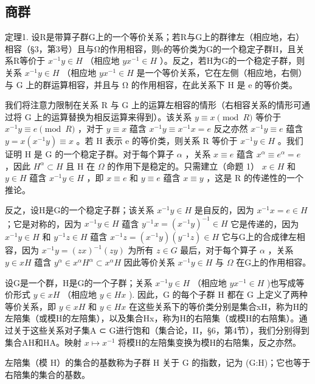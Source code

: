 \subsection{商群}

定理1. 设R是带算子群G上的一个等价关系；若R与G上的群律左（相应地，右）相容（§3，第3号）且与Ω的作用相容，则e的等价类为G的一个稳定子群H，且关系R等价于 \(x^{-1}y \in H\) （相应地 \(yx^{-1} \in H\) ）。反之，若H为G的一个稳定子群，则关系 \(x^{-1}y \in H\) （相应地 \(yx^{-1} \in H\) 是一个等价关系，它在左侧（相应地，右侧）与 G 上的群运算相容，并且与 Ω 的作用相容，在此关系下 H 是 e 的等价类。

我们将注意力限制在关系 R 与 G 上的运算左相容的情形（右相容关系的情形可通过将 G 上的运算替换为相反运算来得到）。该关系 \(y \equiv x \pmod{R}\) 等价于 \(x^{-1}y \equiv e \pmod{R}\) ，对于 \(y \equiv x\) 蕴含 \(x^{-1}y \equiv x^{-1}x = e\) 反之亦然 \(x^{-1}y \equiv e\) 蕴含 \(y = x(x^{-1}y) \equiv x\) 。若 H 表示 e 的等价类，则关系 R 等价于 \(x^{-1}y \in H\) 。我们证明 H 是 G 的一个稳定子群。对于每个算子 \(\alpha\) ，关系 \(x \equiv e\) 蕴含 \(x^{\alpha} \equiv e^{\alpha} = e\) ，因此 \(H^{\alpha} \subset H\) 且 H 在 \(\Omega\) 的作用下是稳定的。只需建立（命题 1） \(x \in H\) 和 \(y \in H\) 蕴含 \(x^{-1}y \in H\) ，即 \(x \equiv e\) 和 \(y \equiv e\) 蕴含 \(x \equiv y\) ，这是 R 的传递性的一个推论。

反之，设H是G的一个稳定子群；该关系 \(x^{-1}y \in H\) 是自反的，因为 \(x^{-1}x = e \in H\) ；它是对称的，因为 \(x^{-1}y \in H\) 蕴含 \(y^{-1}x = (x^{-1}y)^{-1} \in H\) 它是传递的，因为 \(x^{-1}y \in H\) 和 \(y^{-1}z \in H\) 蕴含 \(x^{-1}z = (x^{-1}y)(y^{-1}z) \in H\) 它与G上的合成律左相容，因为 \(x^{-1}y = (zx)^{-1}(zy)\) 为所有 \(z \in G\) 最后，对于每个算子 \(\alpha\) ，关系 \(y \in xH\) 蕴含 \(y^{\alpha} \in x^{\alpha}H^{\alpha} \subset x^{\alpha}H\) 因此等价关系 \(x^{-1}y \in H\) 与 \(\Omega\) 在G上的作用相容。

设G是一个群，H是G的一个子群；关系 \(x^{-1}y \in H\) （相应地 \(yx^{-1} \in H\) )也写成等价形式 \(y \in xH\) （相应地 \(y \in Hx\) ). 因此，G 的每个子群 H 都在 G 上定义了两种等价关系，即 \(y \in xH\) 和 \(y \in Hx\) 在这些关系下的等价类分别是集合xH，称为H的左陪集（或模H的左陪集），以及集合Hx，称为H的右陪集（或模H的右陪集）。通过关于这些关系对子集A ⊂ G进行饱和（集合论，II，§6，第4节），我们分别得到集合AH和HA。映射 \(x \mapsto x^{-1}\) 将模H的左陪集变换为模H的右陪集，反之亦然。

左陪集（模 H）的集合的基数称为子群 H 关于 G 的指数，记为 (G:H)；它也等于右陪集的集合的基数。

